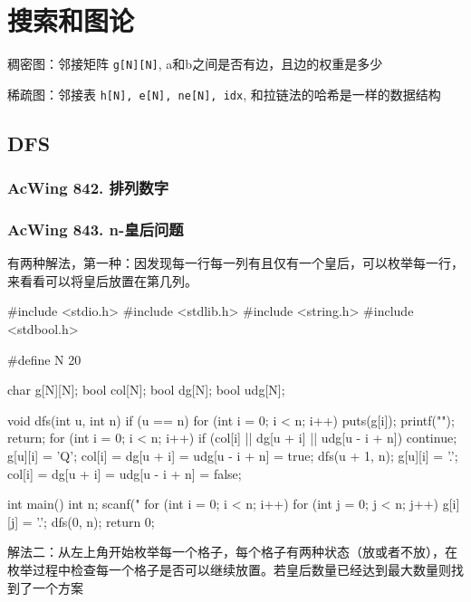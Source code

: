 \chapter{搜索和图论}

稠密图：邻接矩阵 \lstinline{g[N][N]}, a和b之间是否有边，且边的权重是多少

稀疏图：邻接表 \lstinline{h[N], e[N], ne[N], idx}, 和拉链法的哈希是一样的数据结构

\section{DFS}
\subsection{AcWing 842. 排列数字}
\subsection{AcWing 843. n-皇后问题}

有两种解法，第一种：因发现每一行每一列有且仅有一个皇后，可以枚举每一行，来看看可以将皇后放置在第几列。

\begin{mycpptwocol}
#include <stdio.h>
#include <stdlib.h>
#include <string.h>
#include <stdbool.h>

#define N 20

char g[N][N];
bool col[N];
bool dg[N];
bool udg[N];

void dfs(int u, int n)
{
    if (u == n) {
        for (int i = 0; i < n; i++) {
            puts(g[i]);
        }
        printf("\n");
        return;
    }
    for (int i = 0; i < n; i++) {
        if (col[i] || dg[u + i] || udg[u - i + n]) {
            continue;
        }
        g[u][i] = 'Q';
        col[i] = dg[u + i] = udg[u - i + n] = true;
        dfs(u + 1, n);
        g[u][i] = '.';
        col[i] = dg[u + i] = udg[u - i + n] = false;
    }
}

int main()
{
    int n;
    scanf("%
    for (int i = 0; i < n; i++) {
        for (int j = 0; j < n; j++) {
            g[i][j] = '.';
        }
    }
    dfs(0,  n);
    return 0;
}
\end{mycpptwocol}

解法二：从左上角开始枚举每一个格子，每个格子有两种状态（放或者不放），在枚举过程中检查每一个格子是否可以继续放置。若皇后数量已经达到最大数量则找到了一个方案

